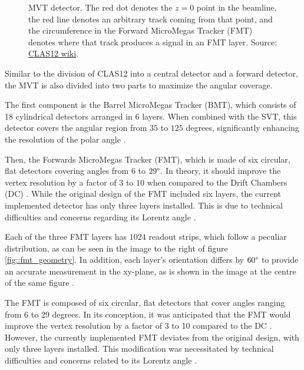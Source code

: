     \begin{figure}[b!]
        \centering{}
        \caption[MVT detector.]{MVT detector.
        The red dot denotes the $z=0$ point in the beamline, the red line denotes an arbitrary track coming from that point, and the circumference in the Forward MicroMegas Tracker (FMT) denotes where that track produces a signal in an FMT layer.
        Source: \hyperlink{https://www.jlab.org/physics/hall-b/clas12}{CLAS12 wiki}.}
        \label{fig::mvt}
    \end{figure}

    Similar to the division of CLAS12 into a central detector and a forward detector, the MVT is also divided into two parts to maximize the angular coverage.

    The first component is the Barrel MicroMegas Tracker (BMT), which consists of 18 cylindrical detectors arranged in 6 layers.
    When combined with the SVT, this detector covers the angular region from $35$ to $125$ degrees, significantly enhancing the resolution of the polar angle \cite{acker2020mvt}.

    Then, the Forwards MicroMegas Tracker (FMT), which is made of six circular, flat detectors covering angles from $6$ to $29\degree$.
    In theory, it should improve the vertex resolution by a factor of $3$ to $10$ when compared to the Drift Chambers (DC) \cite{aune2009}.
    While the original design of the FMT included six layers, the current implemented detector has only three layers installed.
    This is due to technical difficulties and concerns regarding its Lorentz angle \cite{konczykowski2010}.

    Each of the three FMT layers has $1024$ readout strips, which follow a peculiar distribution, as can be seen in the image to the right of figure \ref{fig::fmt_geometry}.
    In addition, each layer's orientation differs by $60\degree$ to provide an accurate measurement in the xy-plane, as is shown in the image at the centre of the same figure \cite{acker2020mvt}.

    The FMT is composed of six circular, flat detectors that cover angles ranging from $6$ to $29$ degrees.
    In its conception, it was anticipated that the FMT would improve the vertex resolution by a factor of 3 to 10 compared to the DC \cite{aune2009}.
    However, the currently implemented FMT deviates from the original design, with only three layers installed.
    This modification was necessitated by technical difficulties and concerns related to its Lorentz angle \cite{konczykowski2010}.

